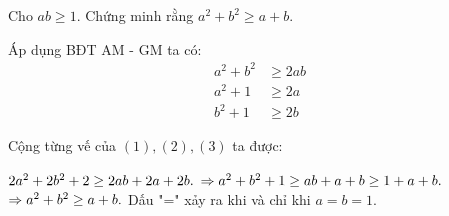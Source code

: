 \begin{problem}
	Cho $ab \ge 1$. Chứng minh rằng $a^2 + b^2 \ge a + b$.

	\solution

	Áp dụng BĐT AM - GM ta có:
	\begin{align*}
	a^2 + b^2 &\ge 2ab \tag{1}\\ 
	a^2 + 1 &\ge 2a \tag{2}\\ 
	b^2 + 1 &\ge 2b \tag{3}
	\end{align*}

	Cộng từng vế của $(1), (2), (3)$ ta được:

	$2a^2 + 2b^2 + 2 \ge 2ab + 2a + 2b. \\$
	$\Rightarrow a^2 + b^2 + 1 \ge ab + a + b \ge 1 + a + b. \\$
	$\Rightarrow a^2 + b^2 \ge a + b. \\$
	Dấu "=" xảy ra khi và chỉ khi $a = b = 1$.
\end{problem}
